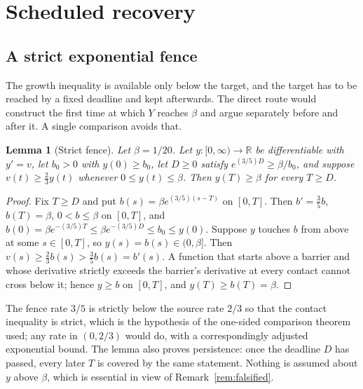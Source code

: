 \documentclass[11pt,a4paper]{article}
\theoremstyle{plain}
\newtheorem{lemma}[theorem]{Lemma}
\theoremstyle{definition}
\theoremstyle{remark}
\newcommand{\R}{\mathbb R}
\begin{document}
\section{Scheduled recovery}\label{sec:recovery}

\subsection{A strict exponential fence}
The growth inequality is available only below the target, and the target has to be reached by a fixed deadline and kept afterwards. The direct route would construct the first time at which $Y$ reaches $\beta$ and argue separately before and after it. A single comparison avoids that.

\begin{lemma}[Strict fence]\label{lem:fence}
Let $\beta=1/20$. Let $y:[0,\infty)\to\R$ be differentiable with $y'=v$, let $b_0>0$ with $y(0)\ge b_0$, let $D\ge0$ satisfy $e^{(3/5)D}\ge\beta/b_0$, and suppose $v(t)\ge\tfrac23y(t)$ whenever $0\le y(t)\le\beta$. Then $y(T)\ge\beta$ for every $T\ge D$.
\end{lemma}
\begin{proof}
Fix $T\ge D$ and put $b(s)=\beta e^{(3/5)(s-T)}$ on $[0,T]$. Then $b'=\tfrac35b$, $b(T)=\beta$, $0<b\le\beta$ on $[0,T]$, and $b(0)=\beta e^{-(3/5)T}\le\beta e^{-(3/5)D}\le b_0\le y(0)$. Suppose $y$ touches $b$ from above at some $s\in[0,T]$, so $y(s)=b(s)\in(0,\beta]$. Then $v(s)\ge\tfrac23b(s)>\tfrac35b(s)=b'(s)$. A function that starts above a barrier and whose derivative strictly exceeds the barrier's derivative at every contact cannot cross below it; hence $y\ge b$ on $[0,T]$, and $y(T)\ge b(T)=\beta$.
\end{proof}
The fence rate $3/5$ is strictly below the source rate $2/3$ so that the contact inequality is strict, which is the hypothesis of the one-sided comparison theorem used; any rate in $(0,2/3)$ would do, with a correspondingly adjusted exponential bound. The lemma also proves persistence: once the deadline $D$ has passed, every later $T$ is covered by the same statement. Nothing is assumed about $y$ above $\beta$, which is essential in view of Remark~\ref{rem:falsified}.
\end{document}
